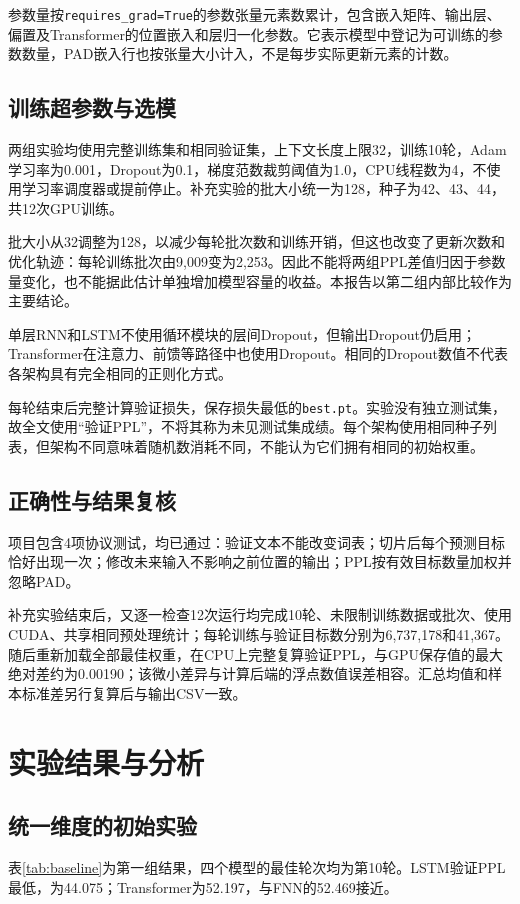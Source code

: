 ﻿\documentclass[UTF8,a4paper,12pt]{ctexart}
\begin{document}
参数量按\texttt{requires\_grad=True}的参数张量元素数累计，包含嵌入矩阵、输出层、偏置及Transformer的位置嵌入和层归一化参数。它表示模型中登记为可训练的参数数量，PAD嵌入行也按张量大小计入，不是每步实际更新元素的计数。

\subsection{训练超参数与选模}
两组实验均使用完整训练集和相同验证集，上下文长度上限32，训练10轮，Adam学习率为0.001，Dropout为0.1，梯度范数裁剪阈值为1.0，CPU线程数为4，不使用学习率调度器或提前停止。补充实验的批大小统一为128，种子为42、43、44，共12次GPU训练。

批大小从32调整为128，以减少每轮批次数和训练开销，但这也改变了更新次数和优化轨迹：每轮训练批次由9,009变为2,253。因此不能将两组PPL差值归因于参数量变化，也不能据此估计单独增加模型容量的收益。本报告以第二组内部比较作为主要结论。

单层RNN和LSTM不使用循环模块的层间Dropout，但输出Dropout仍启用；Transformer在注意力、前馈等路径中也使用Dropout。相同的Dropout数值不代表各架构具有完全相同的正则化方式。

每轮结束后完整计算验证损失，保存损失最低的\texttt{best.pt}。实验没有独立测试集，故全文使用“验证PPL”，不将其称为未见测试集成绩。每个架构使用相同种子列表，但架构不同意味着随机数消耗不同，不能认为它们拥有相同的初始权重。

\subsection{正确性与结果复核}
项目包含4项协议测试，均已通过：验证文本不能改变词表；切片后每个预测目标恰好出现一次；修改未来输入不影响之前位置的输出；PPL按有效目标数量加权并忽略PAD。

补充实验结束后，又逐一检查12次运行均完成10轮、未限制训练数据或批次、使用CUDA、共享相同预处理统计；每轮训练与验证目标数分别为6,737,178和41,367。随后重新加载全部最佳权重，在CPU上完整复算验证PPL，与GPU保存值的最大绝对差约为0.00190；该微小差异与计算后端的浮点数值误差相容。汇总均值和样本标准差另行复算后与输出CSV一致。

\section{实验结果与分析}
\subsection{统一维度的初始实验}
表\ref{tab:baseline}为第一组结果，四个模型的最佳轮次均为第10轮。LSTM验证PPL最低，为44.075；Transformer为52.197，与FNN的52.469接近。
\end{document}
